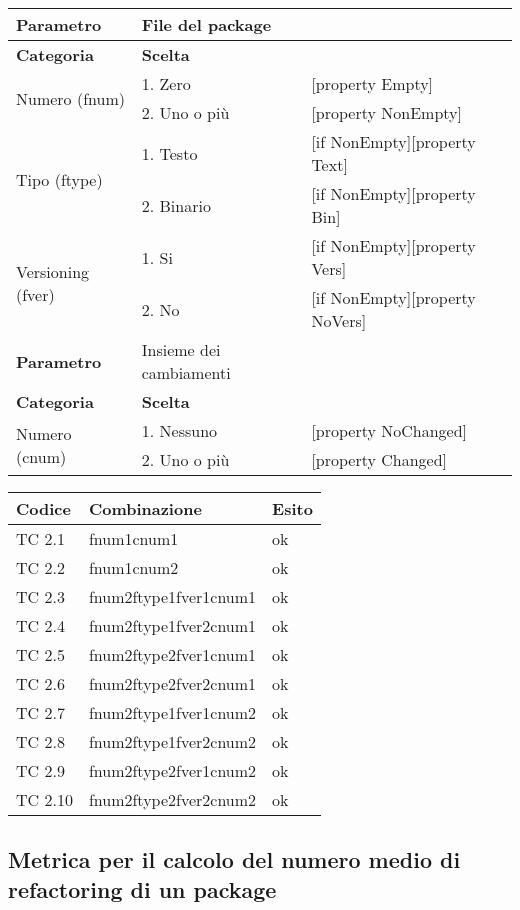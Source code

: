 \begin{tabular}{|p{4cm}|p{4cm}p{5cm}|}
	\hline
	\cellcolor{Gray} \textbf{Parametro}		& File del package		&							\tabularnewline
	\hline
	\rowcolor{Gray}
	\textbf{Categoria} 				& \textbf{Scelta}		&							\tabularnewline
	\hline
	\multirow{2}{*}{Numero (fnum)} 			& 1. Zero 			& [property Empty] 					\tabularnewline
	\cline{2-3}
							& 2. Uno o più			& [property NonEmpty]					\tabularnewline
	\hline
	\multirow{2}{*}{Tipo (ftype)} 			& 1. Testo			& [if NonEmpty][property Text] 				\tabularnewline
	\cline{2-3}
							& 2. Binario			& [if NonEmpty][property Bin]				\tabularnewline
	\hline
	\multirow{2}{*}{Versioning (fver)}		& 1. Si				& [if NonEmpty][property Vers]				\tabularnewline
	\cline{2-3}
							& 2. No				& [if NonEmpty][property NoVers]			\tabularnewline
	\hline
	\cellcolor{Gray} \textbf{Parametro}		& Insieme dei cambiamenti	&							\tabularnewline
	\hline
	\rowcolor{Gray}
	\textbf{Categoria} 				& \textbf{Scelta}		&							\tabularnewline
	\hline
	\multirow{2}{*}{Numero (cnum)} 			& 1. Nessuno 			& [property NoChanged]					\tabularnewline
	\cline{2-3}
							& 2. Uno o più			& [property Changed]					\tabularnewline
	\hline
\end{tabular}

\vspace{1cm}

\begin{tabular}{|p{3cm}|p{7cm}|p{3cm}|}
	  \hline
	  \rowcolor{Gray}
	  \textbf{Codice} & \textbf{Combinazione} & \textbf{Esito}\tabularnewline
	  \hline
	  TC 2.1			& fnum1cnum1 			& ok \tabularnewline
	  \hline
	  TC 2.2 			& fnum1cnum2 			& ok \tabularnewline
	  \hline
	  TC 2.3 			& fnum2ftype1fver1cnum1 	& ok \tabularnewline
	  \hline
	  TC 2.4 			& fnum2ftype1fver2cnum1 	& ok \tabularnewline
	  \hline
	  TC 2.5 			& fnum2ftype2fver1cnum1 	& ok \tabularnewline
	  \hline
	  TC 2.6 			& fnum2ftype2fver2cnum1		& ok \tabularnewline
	  \hline
	  TC 2.7 			& fnum2ftype1fver1cnum2 	& ok \tabularnewline
	  \hline
	  TC 2.8			& fnum2ftype1fver2cnum2 	& ok \tabularnewline
	  \hline
	  TC 2.9			& fnum2ftype2fver1cnum2 	& ok \tabularnewline
	  \hline
	  TC 2.10 			& fnum2ftype2fver2cnum2 	& ok \tabularnewline
	  \hline
\end{tabular}
\clearpage




\subsection{Metrica per il calcolo del numero medio di refactoring di un package}


